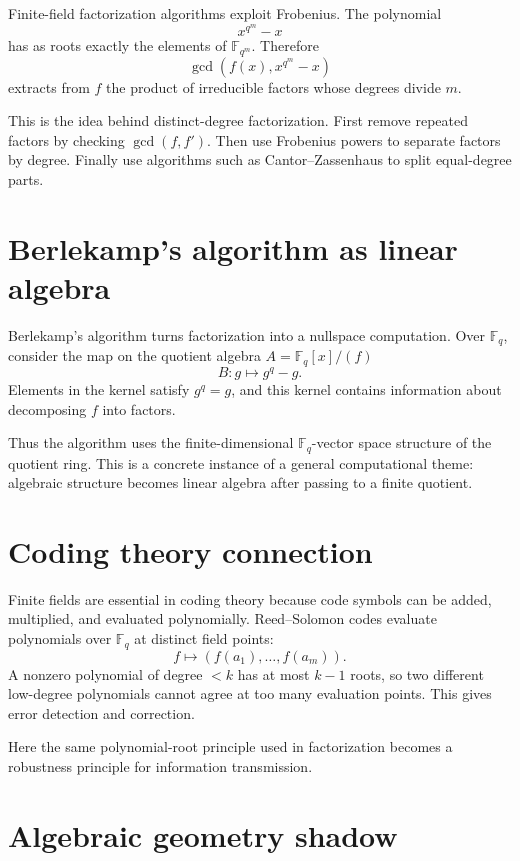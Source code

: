 Finite-field factorization algorithms exploit Frobenius.  The polynomial
\[
  x^{q^m}-x
\]
has as roots exactly the elements of \(\mathbb F_{q^m}\).  Therefore
\[
  \gcd(f(x),x^{q^m}-x)
\]
extracts from \(f\) the product of irreducible factors whose degrees divide \(m\).

This is the idea behind distinct-degree factorization.  First remove repeated factors by checking \(\gcd(f,f')\).  Then use Frobenius powers to separate factors by degree.  Finally use algorithms such as Cantor--Zassenhaus to split equal-degree parts.

\section{Berlekamp's algorithm as linear algebra}

Berlekamp's algorithm turns factorization into a nullspace computation.  Over \(\mathbb F_q\), consider the map on the quotient algebra \(A=\mathbb F_q[x]/(f)\)
\[
  B:g\mapsto g^q-g.
\]
Elements in the kernel satisfy \(g^q=g\), and this kernel contains information about decomposing \(f\) into factors.

Thus the algorithm uses the finite-dimensional \(\mathbb F_q\)-vector space structure of the quotient ring.  This is a concrete instance of a general computational theme: algebraic structure becomes linear algebra after passing to a finite quotient.

\section{Coding theory connection}

Finite fields are essential in coding theory because code symbols can be added, multiplied, and evaluated polynomially.  Reed--Solomon codes evaluate polynomials over \(\mathbb F_q\) at distinct field points:
\[
  f\longmapsto (f(a_1),\ldots,f(a_m)).
\]
A nonzero polynomial of degree \(<k\) has at most \(k-1\) roots, so two different low-degree polynomials cannot agree at too many evaluation points.  This gives error detection and correction.

Here the same polynomial-root principle used in factorization becomes a robustness principle for information transmission.

\section{Algebraic geometry shadow}

